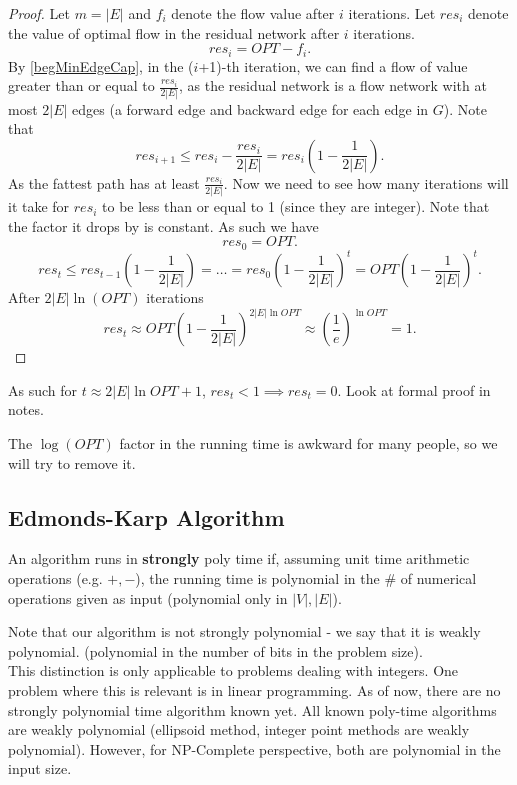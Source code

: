 \documentclass[../main/main.tex]{subfiles}
\begin{document}
\begin{proof}
Let $m=|E|$ and  $f_i$ denote the flow value after $i$ iterations. Let $res_i$ denote the value of optimal flow in the residual network after $i$ iterations.\[
res_i=OPT-f_i
.\] 
By \ref{begMinEdgeCap}, in the ($i$+1)-th iteration, we can find a flow of value greater than or equal to $\frac{res_i}{2|E|}$, as the residual network is a flow network with at most $2|E|$ edges (a forward edge and backward edge for each edge in  $G$). Note that  \[
	res_{i+1}\le res_i-\frac{res_i}{2|E|}=res_i\left( 1-\frac{1}{2|E|} \right) 
.\] As the fattest path has at least $\frac{res_i}{2|E|}$. Now we need to see how many iterations will it take for $res_i$ to be less than or equal to 1 (since they are integer). Note that the factor it drops by is constant. As such we have \[
res_0 = OPT
.\] \[
res_t \le res_{t-1}\left( 1-\frac{1}{2|E|} \right) =\ldots=res_0\left( 1-\frac{1}{2|E|} \right)^{t}=OPT\left( 1-\frac{1}{2|E|}	\right)^{t}.\] 
After $2|E|\ln\left( OPT \right) $ iterations\[
	res_t\approx OPT\left( 1-\frac{1}{2|E|} \right) ^{2|E|\ln OPT}\approx\left( \frac{1}{e} \right) ^{\ln OPT}=1
.\] 
\end{proof}
As such for  $t\approx 2|E|\ln OPT+1$, $res_t<1\implies res_t=0$. Look at formal proof in notes.

The $\log(OPT)$ factor in the running time is awkward for many people, so we will try to remove it.

\subsection{Edmonds-Karp Algorithm}
\begin{definition}
	An algorithm runs in \textbf{strongly} poly time if, assuming unit time arithmetic operations (e.g. $+,-$), the running time is polynomial in the  $\#$ of numerical operations given as input (polynomial only in $|V|,|E|$).
\end{definition}
Note that our algorithm is not strongly polynomial - we say that it is weakly polynomial. (polynomial in the number of bits in the problem size).\\ 

This distinction is only applicable to problems dealing with integers. One problem where this is relevant is in linear programming. As of now, there are no strongly polynomial time algorithm known yet. All known poly-time algorithms are weakly polynomial (ellipsoid method, integer point methods are weakly polynomial). However, for NP-Complete perspective, both are polynomial in the input size.
\end{document}
